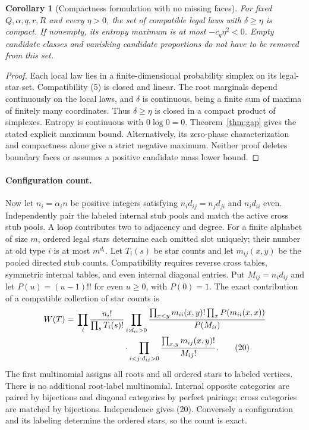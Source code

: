 \documentclass[11pt]{article}
\newtheorem{corollary}{Corollary}
\begin{document}
\begin{corollary}[Compactness formulation with no missing faces]
For fixed $Q,\alpha,q,r,R$ and every $\eta>0$, the set of compatible
legal laws with $\delta\geq\eta$ is compact. If nonempty, its entropy
maximum is at most $-c_q\eta^2<0$. Empty candidate classes and vanishing
candidate proportions do not have to be removed from this set.
\end{corollary}
\begin{proof}
Each local law lies in a finite-dimensional probability simplex on
its legal-star set. Compatibility (5) is closed and linear. The root
marginals depend continuously on the local laws, and $\delta$ is
continuous, being a finite sum of maxima of finitely many coordinates.
Thus $\delta\geq\eta$ is closed in a compact product of simplexes.
Entropy is continuous with $0\log0=0$. Theorem~\ref{thm:gap} gives
the stated explicit maximum bound. Alternatively, its zero-phase
characterization and compactness alone give a strict negative maximum.
Neither proof deletes boundary faces or assumes a positive candidate
mass lower bound.
\end{proof}

\paragraph{Configuration count.}
Now let $n_i=\alpha_i n$ be positive integers satisfying
$n_id_{ij}=n_jd_{ji}$ and $n_id_{ii}$ even. Independently pair the
labeled internal stub pools and match the active cross stub pools.
A loop contributes two to adjacency and degree. For a finite alphabet
of size $m$, ordered legal stars determine each omitted slot uniquely;
their number at old type $i$ is at most $m^{d_i}$. Let $T_i(s)$ be
star counts and let $m_{ij}(x,y)$ be the pooled directed stub counts.
Compatibility requires reverse cross tables, symmetric internal tables,
and even internal diagonal entries. Put $M_{ij}=n_id_{ij}$ and let
$P(u)=(u-1)!!$ for even $u\geq0$, with $P(0)=1$. The exact
contribution of a compatible collection of star counts is
\begin{align}
 W(T)={}&\prod_i\frac{n_i!}{\prod_sT_i(s)!}
  \prod_{i:d_{ii}>0}
    \frac{\prod_{x<y}m_{ii}(x,y)!\prod_xP(m_{ii}(x,x))}{P(M_{ii})}
 \nonumber\\
 &\hspace{20mm}\cdot
   \prod_{i<j:d_{ij}>0}\frac{\prod_{x,y}m_{ij}(x,y)!}{M_{ij}!}.
                                                               \tag{20}
\end{align}
The first multinomial assigns all roots and all ordered stars to
labeled vertices. There is no additional root-label multinomial.
Internal opposite categories are paired by bijections and diagonal
categories by perfect pairings; cross categories are matched by
bijections. Independence gives (20). Conversely a configuration and
its labeling determine the ordered stars, so the count is exact.
\end{document}
